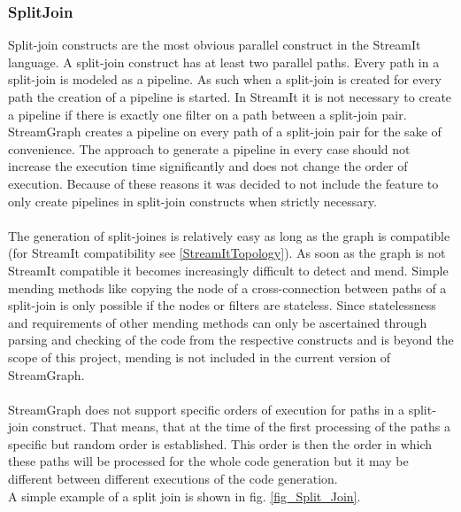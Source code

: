 \documentclass[journal]{IEEEtran}
\begin{document}
\subsubsection{SplitJoin}
\noindent Split-join constructs are the most obvious parallel construct in the
StreamIt language. A split-join construct has at least two parallel paths. Every
path in a split-join is modeled as a pipeline. As such when a split-join is
created for every path the creation of a pipeline is started. In StreamIt it is
not necessary to create a pipeline if there is exactly one filter on a path
between a split-join pair. StreamGraph creates a pipeline on every path of a
split-join pair for the sake of convenience. The approach to generate a
pipeline in every case should not increase the execution time significantly and
does not change the order of execution. Because of these reasons it was decided
to not include the feature to only create pipelines in split-join constructs
when strictly necessary.\\
\\
The generation of split-joines is relatively easy as long as the graph is compatible
(for StreamIt compatibility see \ref{StreamItTopology}). As soon as the graph is not 
StreamIt compatible it becomes increasingly difficult to detect and mend. Simple 
mending methods like copying the node of a cross-connection between paths of a 
split-join is only possible if the nodes or filters are stateless. Since 
statelessness and requirements of other mending methods can only be ascertained 
through parsing and checking of the code from the respective constructs and is beyond 
the scope of this project, mending is not included in the current version of StreamGraph.\\
\\
StreamGraph does not support specific orders of execution for paths in a split-join 
construct. That means, that at the time of the first processing of the paths a specific
but random order is established. This order is then the order in which these paths will 
be processed for the whole code generation but it may be different between different
executions of the code generation.\\
A simple example of a split join is shown in fig. \ref{fig_Split_Join}.\\
\end{document}
